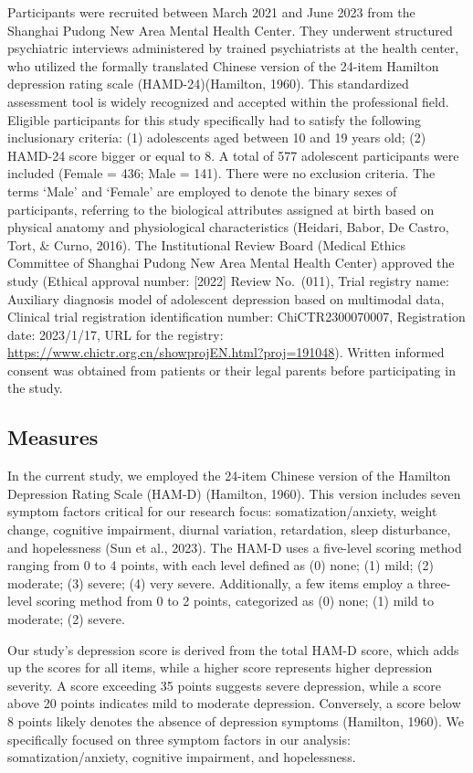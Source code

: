 \documentclass[
  man,floatsintext]{apa6}
\begin{document}
Participants were recruited between March 2021 and June 2023 from the Shanghai Pudong New Area Mental Health Center. They underwent structured psychiatric interviews administered by trained psychiatrists at the health center, who utilized the formally translated Chinese version of the 24-item Hamilton depression rating scale (HAMD-24)(Hamilton, 1960). This standardized assessment tool is widely recognized and accepted within the professional field. Eligible participants for this study specifically had to satisfy the following inclusionary criteria: (1) adolescents aged between 10 and 19 years old; (2) HAMD-24 score bigger or equal to 8. A total of 577 adolescent participants were included (Female = 436; Male = 141). There were no exclusion criteria. The terms `Male' and `Female' are employed to denote the binary sexes of participants, referring to the biological attributes assigned at birth based on physical anatomy and physiological characteristics (Heidari, Babor, De Castro, Tort, \& Curno, 2016). The Institutional Review Board (Medical Ethics Committee of Shanghai Pudong New Area Mental Health Center) approved the study (Ethical approval number: {[}2022{]} Review No.~(011), Trial registry name: Auxiliary diagnosis model of adolescent depression based on multimodal data, Clinical trial registration identification number: ChiCTR2300070007, Registration date: 2023/1/17, URL for the registry: \url{https://www.chictr.org.cn/showprojEN.html?proj=191048}). Written informed consent was obtained from patients or their legal parents before participating in the study.

\hypertarget{measures}{%
\subsection{Measures}\label{measures}}

In the current study, we employed the 24-item Chinese version of the Hamilton Depression Rating Scale (HAM-D) (Hamilton, 1960). This version includes seven symptom factors critical for our research focus: somatization/anxiety, weight change, cognitive impairment, diurnal variation, retardation, sleep disturbance, and hopelessness (Sun et al., 2023). The HAM-D uses a five-level scoring method ranging from 0 to 4 points, with each level defined as (0) none; (1) mild; (2) moderate; (3) severe; (4) very severe. Additionally, a few items employ a three-level scoring method from 0 to 2 points, categorized as (0) none; (1) mild to moderate; (2) severe.

Our study's depression score is derived from the total HAM-D score, which adds up the scores for all items, while a higher score represents higher depression severity. A score exceeding 35 points suggests severe depression, while a score above 20 points indicates mild to moderate depression. Conversely, a score below 8 points likely denotes the absence of depression symptoms (Hamilton, 1960). We specifically focused on three symptom factors in our analysis: somatization/anxiety, cognitive impairment, and hopelessness.
\end{document}
